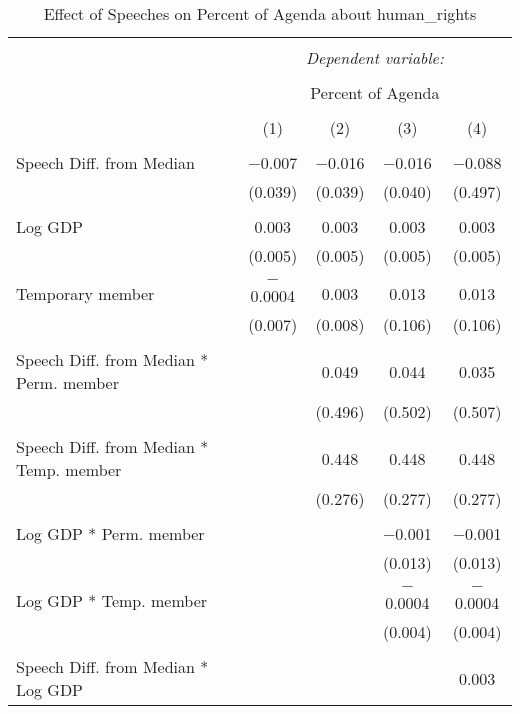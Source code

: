 
\begin{table}[!htbp] \centering 
  \caption{Effect of Speeches on Percent of Agenda about human_rights} 
  \label{} 
\begin{tabular}{@{\extracolsep{5pt}}lcccc} 
\\[-1.8ex]\hline 
\hline \\[-1.8ex] 
 & \multicolumn{4}{c}{\textit{Dependent variable:}} \\ 
\cline{2-5} 
\\[-1.8ex] & \multicolumn{4}{c}{Percent of Agenda} \\ 
\\[-1.8ex] & (1) & (2) & (3) & (4)\\ 
\hline \\[-1.8ex] 
 Speech Diff. from Median & $-$0.007 & $-$0.016 & $-$0.016 & $-$0.088 \\ 
  & (0.039) & (0.039) & (0.040) & (0.497) \\ 
  & & & & \\ 
 Log GDP & 0.003 & 0.003 & 0.003 & 0.003 \\ 
  & (0.005) & (0.005) & (0.005) & (0.005) \\ 
  & & & & \\ 
 Temporary member & $-$0.0004 & 0.003 & 0.013 & 0.013 \\ 
  & (0.007) & (0.008) & (0.106) & (0.106) \\ 
  & & & & \\ 
 Speech Diff. from Median * Perm. member &  & 0.049 & 0.044 & 0.035 \\ 
  &  & (0.496) & (0.502) & (0.507) \\ 
  & & & & \\ 
 Speech Diff. from Median * Temp. member &  & 0.448 & 0.448 & 0.448 \\ 
  &  & (0.276) & (0.277) & (0.277) \\ 
  & & & & \\ 
 Log GDP * Perm. member &  &  & $-$0.001 & $-$0.001 \\ 
  &  &  & (0.013) & (0.013) \\ 
  & & & & \\ 
 Log GDP * Temp. member &  &  & $-$0.0004 & $-$0.0004 \\ 
  &  &  & (0.004) & (0.004) \\ 
  & & & & \\ 
 Speech Diff. from Median * Log GDP &  &  &  & 0.003 \\ 

\end{tabular}
\end{table}
